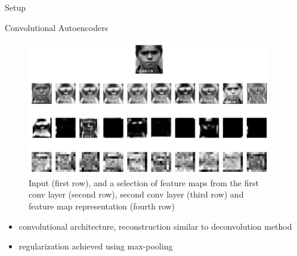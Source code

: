 \documentclass[final]{beamer}
\newlength{\sepwid}
\newlength{\onecolwid}
\begin{document}
\begin{frame}[t] %

\begin{columns}[t] %

\begin{column}{\sepwid}\end{column} %

\begin{column}{\onecolwid} %


\begin{alertblock}{Setup}

\begin{block}{Convolutional Autoencoders}

\begin{figure}
\includegraphics[width=0.8\linewidth]{graphics/feature_map_walkthrough_ckplus.png}
\caption{Input (first row), and a selection of feature maps from the first conv layer (second row), second conv layer (third row) and feature map representation (fourth row)}
\end{figure}

\begin{itemize}
	\item convolutional architecture, reconstruction similar to deconvolution method 
	\item regularization achieved using max-pooling
\end{itemize}

\end{block}



\end{alertblock}
\end{column}
\end{columns}
\end{frame}
\end{document}
